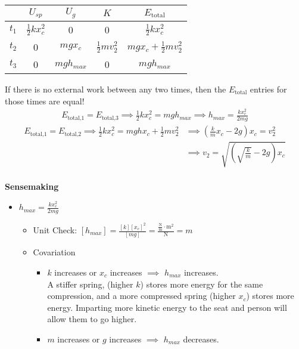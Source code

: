 \documentclass[]{article}
\begin{document}
\begin{TeacherMargin}
\begin{center}
	\begin{tabular}{c||c|c|c||c}
		& $U_{sp}$ & $U_{g}$ & $K$ & $E_{\text{total}}$ \\ \hline
		$t_{1}$ & $\frac{1}{2}kx_{c}^{2}$ & 0 & 0 & $\frac{1}{2}kx_{c}^{2}$ \\ \hline
		$t_{2}$ & 0 & $mgx_{c}$ & $\frac{1}{2}mv_{2}^{2}$ & $mgx_{c}+\frac{1}{2}mv_{2}^{2}$ \\ \hline
		$t_{3}$ & 0 & $mgh_{max}$ & 0 & $mgh_{max}$
	\end{tabular}
\end{center}
If there is no external work between any two times, then the $E_{\text{total}}$ entries for those times are equal!
\begin{align*}
	E_{\text{total,1}} = E_{\text{total,3}} \implies \frac{1}{2}kx_{c}^{2} = mgh_{max} \implies h_{max}=\frac{kx_{c}^{2}}{2mg}
\end{align*}
\begin{align*}
	E_{\text{total,1}} = E_{\text{total,2}} \implies
	\frac{1}{2}kx_{c}^{2} = mghx_{c} + \frac{1}{2}mv_{2}^{2} & \implies
	\left(\frac{k}{m}x_{c}-2g\right)x_{c} = v_{2}^{2} \\
	& \implies
	v_{2} = \sqrt{\left(\sqrt{\frac{k}{m}}-2g\right)x_{c}}
\end{align*}
\vspace{-1.8cm} \\
\textbf{Sensemaking} \\
\begin{itemize}
	\item $h_{max}=\frac{kx_{c}^{2}}{2mg}$
	\begin{itemize}
		\item Unit Check: $[h_{max}]=\frac{[k][x_{c}]^{2}}{[mg]} = \frac{\frac{\text{N}}{\text{m}}\cdot\text{m}^{2}}{\text{N}} = m$
		\item Covariation
		\begin{itemize}
			\item $k$ increases or $x_{c}$ increases $\implies$ $h_{max}$ increases. \\
			A stiffer spring, (higher $k$) stores more energy for the same compression, and a more compressed spring (higher $x_{c}$) stores more energy. Imparting more kinetic energy to the seat and person will allow them to go higher.
			\item $m$ increases or $g$ increases $\implies$ $h_{max}$ decreases. \\

\end{itemize}
\end{itemize}
\end{itemize}
\end{TeacherMargin}
\end{document}

